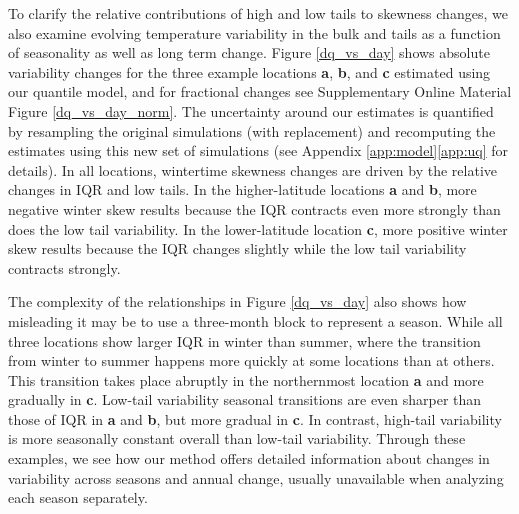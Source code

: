 \documentclass{ametsoc}
\begin{document}
To clarify the relative contributions of high and low tails to skewness changes, we 
also examine evolving temperature variability in the bulk and tails as a function of seasonality as well as long term change. 
Figure \ref{dq_vs_day} shows absolute variability changes 
for the three example locations \textbf{a}, \textbf{b}, and \textbf{c}
estimated using our quantile model, and for fractional changes see Supplementary Online Material Figure \ref{dq_vs_day_norm}. The uncertainty around our estimates is quantified by resampling the original simulations (with replacement) and recomputing the estimates using this new set of simulations (see Appendix \ref{app:model}\ref{app:uq} for details). In all locations, wintertime skewness changes are driven by the relative changes in IQR and low tails. In the higher-latitude locations \textbf{a} and \textbf{b}, more negative winter skew results because the IQR contracts even more strongly than does the low tail variability. %
In the lower-latitude location \textbf{c}, more positive winter skew results because the IQR changes slightly while the low tail variability contracts strongly. 


%



The complexity of the relationships in Figure \ref{dq_vs_day} also shows how misleading it may be to use a three-month block to represent a season. While all three locations show larger IQR in winter than summer, where the transition from winter to summer happens more quickly at some locations than at others. This transition takes place abruptly in the northernmost location \textbf{a} and more gradually in \textbf{c}. Low-tail variability seasonal transitions are even sharper than those of IQR in \textbf{a} and \textbf{b}, but more gradual in \textbf{c}.
In contrast, high-tail variability is more seasonally constant overall than low-tail variability. 
Through these examples, we see how our method offers detailed information about changes in variability across seasons and annual change, usually unavailable when analyzing each season separately. 
\end{document}
